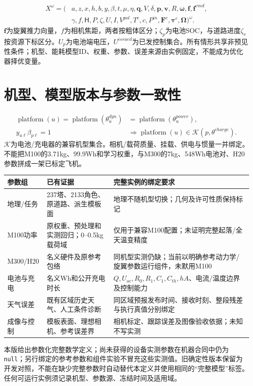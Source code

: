 \begin{equation}
 \begin{aligned}
 X^\omega=(&a,z,x,h,b,y,\beta,t,\mu,\eta,\mathbf q,V,\delta,
 \mathbf p,\mathbf v,R,\boldsymbol\omega,\mathbf f,\mathbf f^{cmd},\\
           &\gamma,f,\mathsf H,P,\zeta,U,I,V^{pol},T^c,c,P^{in},
 \mathbf F^c,\boldsymbol\tau^c,\boldsymbol\Omega)^\omega.
 \end{aligned}
 \label{eng:eq:jointvariables}
\end{equation}
\noindent $\mathbf f$为旋翼推力向量，$f$为相机焦距，两者按粗体区分；$\zeta_p$为电池SOC，与道路进度$\zeta_v$按资源下标区分。$U_p$为电池端电压，$U^{issued}$为已发控制集合。所有情形共享非预见性条件；机型、能耗模型ID、权重、参数、误差来源由实例固定，不能成为优化器择优变量。
\clearpage
\section{机型、模型版本与参数一致性}
\begin{align}
 \operatorname{platform}(u)=\operatorname{platform}(\theta_u^{dyn})
 &=\operatorname{platform}(\theta_u^{power}),\\
 y_{u\ell}\beta_{p\ell}=1&\Rightarrow
 \operatorname{platform}(u)\in\mathcal K(p,\theta^{charge}).
 \label{eng:eq:platformbinding}
\end{align}
\noindent $\mathcal K$为电池/充电器的兼容机型集合。相机/载荷质量、挂载、供电与惯量一并绑定。不能把M100的3.71kg、99.9Wh和学习权重，与M300的7kg、548Wh电池对、H20参数拼成一架已标定飞机。
\begin{center}\small
\begin{tabular}{p{.20\linewidth}p{.37\linewidth}p{.33\linewidth}}\toprule
参数组 & 已有证据 & 完整实例的绑定要求\\\midrule
地理/任务 & 237塔、2133角色、原道路、派生模板面 & 地理不随机型切换；几何及许可性质保持标记\\
M100功率 & 原权重、预处理和实测回归；0--0.5kg载荷域 & 仅用于兼容M100配置；未证明完整起落/全天温变精度\\
M300/H20 & 名义硬件及原参考包络 & 同机型实测仍缺；当前以明确参考动力学/旋翼参数运行组件，未默用M100\\
电池与充电 & 名义Wh和公开充电时长 & $Q,U_{oc},R_0,R_1,C_1,C_{th},hA$、电流/温度边界及控制能力\\
天气误差 & 既有区域历史天气、人工条件诊断 & 同区域预报发布时间、接收时刻、整段残差与执行真值分别绑定\\
成像与控制 & 模板表面、理想相机、参考误差界 & 相机标定、跟踪误差及图像验收依据；未知不写实测\\\bottomrule
\end{tabular}\end{center}
\noindent 本版给出参数化完整数学定义；尚未获得的设备实测参数在机器合同中仍为\texttt{null}；另行绑定的参考参数和组件实验不冒充这些实测值。旧确定性版本保留为开发对照，不能在缺少完整参数时自动替代本定义并使用相同的“完整模型”标签。任何可运行实例须记录机型、参数源、冻结时间及适用域。
\clearpage

